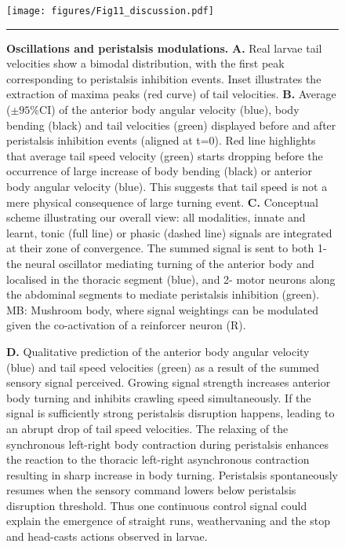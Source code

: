 \documentclass[11pt,a4paper]{article}
\begin{document}
\begin{figure}
\begin{center}
\texttt{[image: figures/Fig11\_discussion.pdf]}
\caption{{\bf Oscillations and peristalsis modulations.} {\bf A.} Real larvae tail velocities show a bimodal distribution, with the first peak corresponding to peristalsis inhibition events. Inset illustrates the extraction of maxima peaks (red curve) of tail velocities.
{\bf B.} Average ($\pm 95\%$CI) of the anterior body angular velocity (blue), body bending (black) and tail velocities (green) displayed before and after peristalsis inhibition events (aligned at t=0). Red line highlights that average tail speed velocity (green) starts dropping before the occurrence of large increase of body bending (black) or anterior body angular velocity (blue). This suggests that tail speed is not a mere physical consequence of large turning event.
{\bf C.} Conceptual scheme illustrating our overall view: all modalities, innate and learnt, tonic (full line) or phasic (dashed line) signals are integrated at their zone of convergence. The summed signal is sent to both 1-the neural oscillator mediating turning of the anterior body and localised in the thoracic segment (blue), and 2- motor neurons along the abdominal segments to mediate peristalsis inhibition (green). MB: Mushroom body, where signal weightings can be modulated given the co-activation of a reinforcer neuron (R).
\label{fig:Peristalsis}}
\hrule
\end{center}
\end{figure}



\begin{figure}
\ContinuedFloat
\caption{
{\bf D.} Qualitative prediction of the anterior body angular velocity (blue) and tail speed velocities (green) as a result of the summed sensory signal perceived. Growing signal strength increases anterior body turning and inhibits crawling speed simultaneously. If the signal is sufficiently strong peristalsis disruption happens, leading to an abrupt drop of tail speed velocities. The relaxing of the synchronous left-right body contraction during peristalsis enhances the reaction to the thoracic left-right asynchronous contraction resulting in sharp increase in body turning. Peristalsis spontaneously resumes when the sensory command lowers below peristalsis disruption threshold. Thus one continuous control signal could explain the emergence of straight runs, weathervaning and the stop and head-casts actions observed in larvae.
}
\end{figure}




\clearpage



%
\end{document}

